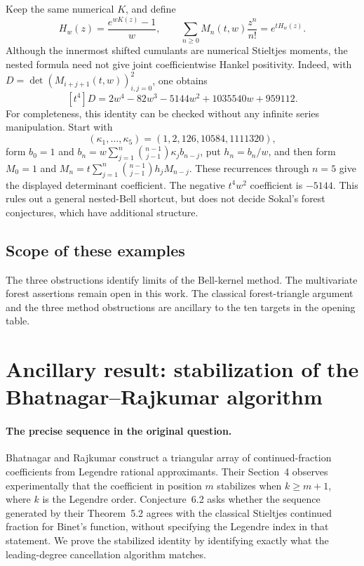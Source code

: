 \documentclass[11pt,a4paper]{article}
\theoremstyle{definition}
\theoremstyle{remark}
\numberwithin{equation}{section}
\begin{document}
Keep the same numerical $K$, and define
\[
 H_w(z)=\frac{e^{wK(z)}-1}{w},\qquad
 \sum_{n\ge0}M_n(t,w)\frac{z^n}{n!}=e^{tH_w(z)}.
\]
Although the innermost shifted cumulants are numerical Stieltjes
moments, the nested formula need not give joint coefficientwise Hankel
positivity. Indeed, with
$D=\det(M_{i+j+1}(t,w))_{i,j=0}^{2}$, one obtains
\[
 [t^4]D=2w^4-82w^3-5144w^2+1035540w+959112.
\]
For completeness, this identity can be checked without any infinite
series manipulation. Start with
\[
 (\kappa_1,\ldots,\kappa_5)=(1,2,126,10584,1111320),
\]
form $b_0=1$ and
$b_n=w\sum_{j=1}^{n}\binom{n-1}{j-1}\kappa_jb_{n-j}$,
put $h_n=b_n/w$, and then form
$M_0=1$ and
$M_n=t\sum_{j=1}^{n}\binom{n-1}{j-1}h_jM_{n-j}$.
These recurrences through $n=5$ give the displayed determinant
coefficient. The negative $t^4w^2$ coefficient is $-5144$.
This rules out a general nested-Bell shortcut, but does not decide
Sokal's forest conjectures, which have additional structure.

\subsection{Scope of these examples}

The three obstructions identify limits of the Bell-kernel method.
The multivariate forest assertions remain open in this work.
The classical forest-triangle argument and the three method obstructions
are ancillary to the ten targets in the opening table.

\section{Ancillary result: stabilization of the Bhatnagar--Rajkumar algorithm}
\label{sec:br-coefficients}

\paragraph{The precise sequence in the original question.}
Bhatnagar and Rajkumar \cite{BhatnagarRajkumar2023} construct a triangular array of continued-fraction
coefficients from Legendre rational approximants. Their Section~4
observes experimentally that the coefficient in position $m$ stabilizes when
$k\ge m+1$, where $k$ is the Legendre order. Conjecture~6.2 asks
whether the sequence generated by their Theorem~5.2 agrees with the
classical Stieltjes continued fraction for Binet's function, without
specifying the Legendre index in that statement.
We prove the stabilized identity by identifying exactly what the
leading-degree cancellation algorithm matches.
\end{document}

